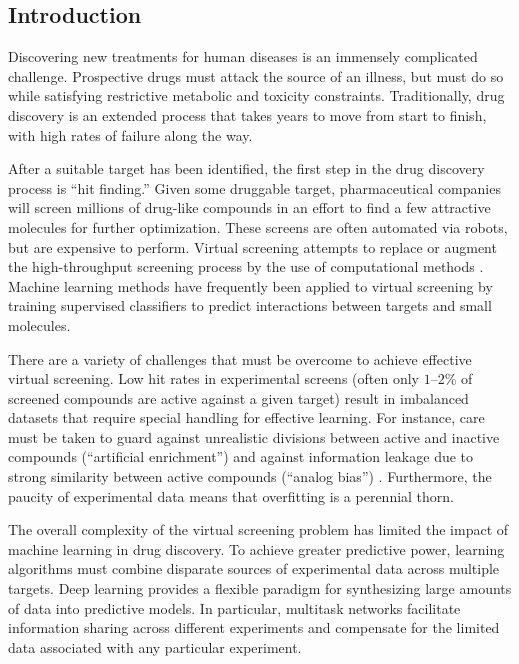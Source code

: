 \subsection{Introduction}
\label{intro}

Discovering new treatments for human diseases is an immensely complicated
challenge. Prospective drugs must attack the source of an illness, but must
do so while satisfying restrictive metabolic and toxicity constraints.
Traditionally, drug discovery is an extended process that takes years to
move from start to finish, with high rates of failure along the way.

After a suitable target has been identified, the first step in the drug
discovery process is ``hit finding.'' Given some druggable target,
pharmaceutical companies will screen millions of drug-like compounds in an
effort to find a few attractive molecules for further optimization. These
screens are often automated via robots, but are expensive to perform.
Virtual screening attempts to replace or augment the high-throughput
screening process by the use of computational methods
\cite{shoichet2004virtual}. Machine learning methods have frequently been
applied to virtual screening by training supervised classifiers to predict
interactions between targets and small molecules.

There are a variety of challenges that must be overcome to achieve
effective virtual screening. Low hit rates in experimental screens (often
only $1$--$2$\% of screened compounds are active against a given target)
result in imbalanced datasets that require special handling for effective
learning. For instance, care must be taken to guard against unrealistic
divisions between active and inactive compounds (``artificial enrichment'')
and against information leakage due to strong similarity between active
compounds (``analog bias'') \cite{rohrer2009maximum}.  Furthermore, the
paucity of experimental data means that overfitting is a perennial thorn.

The overall complexity of the virtual screening problem has limited the
impact of machine learning in drug discovery. To achieve greater predictive
power, learning algorithms must combine disparate sources of experimental
data across multiple targets. Deep learning provides a flexible paradigm
for synthesizing large amounts of data into predictive models. In
particular, multitask networks facilitate information sharing across
different experiments and compensate for the limited data associated with
any particular experiment.

